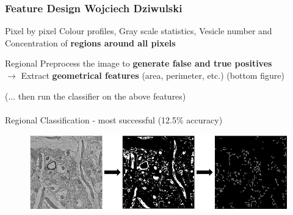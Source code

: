 \documentclass[10pt]{beamer}
\begin{document}
\begin{frame}[fragile]
  \frametitle{Feature Design  \hspace{0pt plus 1 filll} \small{Wojciech Dziwulski}}

  
  
  \begin{block}{Pixel by pixel}
  		Colour profiles, Gray scale statistics, Vesicle number and Concentration of \textbf{regions around all pixels}
  \end{block}

  \begin{block}{Regional}
      Preprocess the image to \textbf{generate false and true positives} \\ $\rightarrow$ Extract \textbf{geometrical features} (area, perimeter, etc.) (bottom figure)
  \end{block}
  
  (... then run the classifier on the above features) \\
  
  $ $ \\
  
  \alert{Regional Classification} - most successful (12.5\% accuracy)
  
  \begin{figure}
  			\centering
  			\includegraphics[width=.5\paperwidth]{pipeline.JPG}
  \end{figure}
\begin{center}

\end{center}

  
\end{frame}
\end{document}
